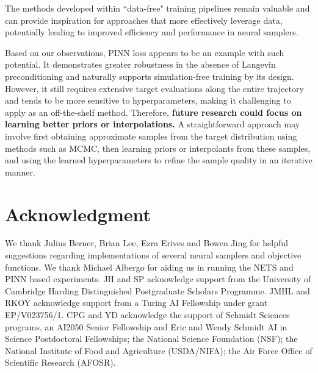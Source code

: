 The methods developed within ``data-free" training pipelines remain valuable and can provide inspiration for approaches that more effectively leverage data, potentially leading to improved efficiency and performance in neural samplers.
\par
Based on our observations, PINN loss appears to be an example with such potential. 
It demonstrates greater robustness in the absence of Langevin preconditioning and naturally supports simulation-free training by its design. 
However, it still requires extensive target evaluations along the entire trajectory and tends to be more sensitive to hyperparameters, making it challenging to apply as an off-the-shelf method.
Therefore, \textbf{future research could focus on learning better priors or interpolations.} 
A straightforward approach may involve first obtaining approximate samples from the target distribution using methods such as MCMC, then learning priors or interpolants from these samples, and using the learned hyperparameters to refine the sample quality in an iterative manner. 





\section*{Acknowledgment}
We thank Julius Berner, Brian Lee, Ezra Erives and Bowen Jing for helpful suggestions regarding implementations of several neural samplers and objective functions. We thank Michael Albergo for aiding us in running the NETS and PINN based experiments. 
JH and SP acknowledge support from the University of Cambridge Harding Distinguished Postgraduate Scholars Programme.  
JMHL and RKOY acknowledge support from a Turing AI Fellowship under grant EP/V023756/1. 
CPG and YD acknowledge the support of Schmidt Sciences programs, an AI2050 Senior Fellowship and Eric and Wendy Schmidt AI in Science Postdoctoral Fellowships; the National Science Foundation (NSF); the National Institute of Food and Agriculture (USDA/NIFA); the Air Force Office of Scientific Research (AFOSR).
